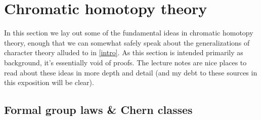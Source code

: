 \section{Chromatic homotopy theory}
\label{chrom}

In this section we lay out some of the fundamental ideas in chromatic
homotopy theory, enough that we can somewhat safely speak about the
generalizations of character theory alluded to in \cref{intro}. As
this section is intended primarily as background, it's essentially
void of proofs. The lecture notes
\cite{hopkins-coctalos,lurie-chromatic} are nice places to read about
these ideas in more depth and detail (and my debt to these sources in
this exposition will be clear).

\subsection{Formal group laws \& Chern classes}

